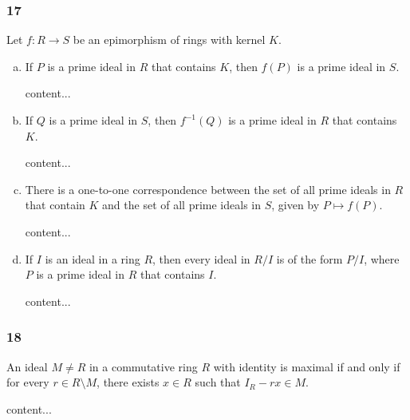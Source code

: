 \subsubsection*{17}
\begin{graybox}
	Let $f : R \to S$ be an epimorphism of rings with kernel $K$.
\end{graybox}
\begin{enumerate}[(a)]
	\item 
	\begin{lightgraybox}
		If $P$ is a prime ideal in $R$ that contains $K$, then $f(P)$ is a prime ideal in $S$.
	\end{lightgraybox}
	\begin{solution}
		content...
	\end{solution}
	
	\item
	\begin{lightgraybox}
		If $Q$ is a prime ideal in $S$, then $f^{-1}(Q)$ is a prime ideal in $R$ that contains $K$.
	\end{lightgraybox}
	\begin{solution}
		content...
	\end{solution}
	
	\item
	\begin{lightgraybox}
		There is a one-to-one correspondence between the set of all prime ideals in $R$ that contain $K$ and the set of all prime ideals in $S$, given by $P \mapsto f(P)$. 
	\end{lightgraybox}
	\begin{solution}
		content...
	\end{solution}
	
	\item
	\begin{lightgraybox}
		If $I$ is an ideal in a ring $R$, then every ideal in $R / I$ is of the form $P / I$, where $P$ is a prime ideal in $R$ that contains $I$.
	\end{lightgraybox}
	\begin{solution}
		content...
	\end{solution}
\end{enumerate}

\subsubsection*{18}
\begin{graybox}
	An ideal $M \neq R$ in a commutative ring $R$ with identity is maximal if and only if for every $r \in R \setminus M$, there exists $x \in R$ such that $I_R - rx \in M$. 
\end{graybox}
\begin{solution}
	content...
\end{solution}

